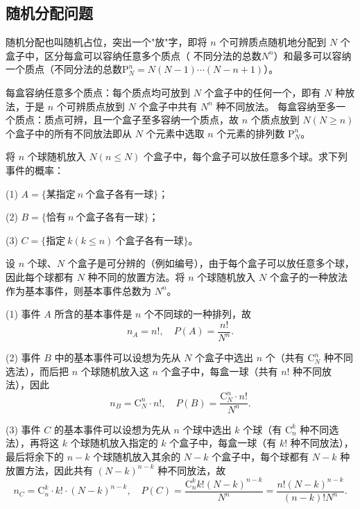 \documentclass[lang=cn,11pt]{elegantbook}
\begin{document}
\subsection*{随机分配问题}

随机分配也叫随机占位，突出一个"放"字，即将 \(n\) 个可辨质点随机地分配到 \(N\) 个盒子中，区分每盒可以容纳任意多个质点（ 不同分法的总数\(N^n\)）和最多可以容纳一个质点（不同分法的总数\(\mathrm{P}_N^n = N(N-1)\cdots(N-n+1)\)）。

\begin{note}
每盒容纳任意多个质点：每个质点均可放到 \(N\) 个盒子中的任何一个，即有 \(N\) 种放法，于是 \(n\) 个可辨质点放到 \(N\) 个盒子中共有 \(N^n\) 种不同放法。\newline
每盒容纳至多一个质点：质点可辨，且一个盒子至多容纳一个质点，故 \(n\) 个质点放到 \(N(N\ge n)\) 个盒子中的所有不同放法即从 \(N\) 个元素中选取 \(n\) 个元素的排列数 \(\mathrm{P}_N^n\)。
\end{note}

\begin{exercise}\label{exer:1-4}
将 \(n\) 个球随机放入 \(N(n\le N)\) 个盒子中，每个盒子可以放任意多个球。求下列事件的概率：\par
(1) \(A=\{\text{某指定} \ n \ \text{个盒子各有一球}\}\)；\par
(2) \(B=\{\text{恰有} \ n \ \text{个盒子各有一球}\}\)；\par
(3) \(C=\{\text{指定} \ k(k\le n) \ \text{个盒子各有一球}\}\)。
\end{exercise}

\begin{solution}
设 \(n\) 个球、\(N\) 个盒子是可分辨的（例如编号），由于每个盒子可以放任意多个球，因此每个球都有 \(N\) 种不同的放置方法。将 \(n\) 个球随机放入 \(N\) 个盒子的一种放法作为基本事件，则基本事件总数为 \(N^n\)。

(1) 事件 \(A\) 所含的基本事件是 \(n\) 个不同球的一种排列，故
\[
n_A = n!, \quad P(A) = \frac{n!}{N^n}.
\]

(2) 事件 \(B\) 中的基本事件可以设想为先从 \(N\) 个盒子中选出 \(n\) 个（共有 \(\mathrm{C}_N^n\) 种不同选法），而后把 \(n\) 个球随机放入这 \(n\) 个盒子中，每盒一球（共有 \(n!\) 种不同放法），因此
\[
n_B = \mathrm{C}_N^n \cdot n!, \quad P(B) = \frac{\mathrm{C}_N^n \cdot n!}{N^n}.
\]

(3) 事件 \(C\) 的基本事件可以设想为先从 \(n\) 个球中选出 \(k\) 个球（有 \(\mathrm{C}_n^k\) 种不同选法），再将这 \(k\) 个球随机放入指定的 \(k\) 个盒子中，每盒一球（有 \(k!\) 种不同放法），最后将余下的 \(n-k\) 个球随机放入其余的 \(N-k\) 个盒子中，每个球都有 \(N-k\) 种放置方法，因此共有 \((N-k)^{n-k}\) 种不同放法，故
\[
n_C = \mathrm{C}_n^k \cdot k! \cdot (N-k)^{n-k}, \quad P(C) = \frac{\mathrm{C}_n^k k! (N-k)^{n-k}}{N^n} = \frac{n! (N-k)^{n-k}}{(n-k)! N^n}.
\]
\end{solution}
\end{document}
